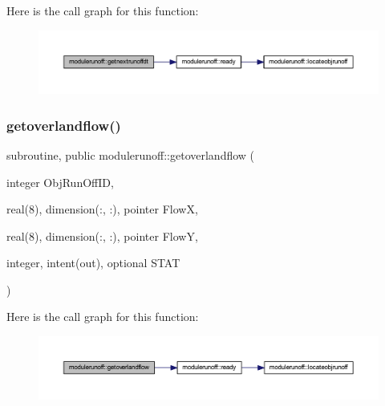 Here is the call graph for this function\+:\nopagebreak
\begin{figure}[H]
\begin{center}
\leavevmode
\includegraphics[width=350pt]{namespacemodulerunoff_a364cfd3bda8ba61cda13d20f848f20dc_cgraph}
\end{center}
\end{figure}
\mbox{\label{namespacemodulerunoff_a4d5da3ce5f5efddf1d2957ea8e1e1791}} 
\subsubsection{\texorpdfstring{getoverlandflow()}{getoverlandflow()}}
{\footnotesize\ttfamily subroutine, public modulerunoff\+::getoverlandflow (\begin{DoxyParamCaption}\item[{integer}]{Obj\+Run\+Off\+ID,  }\item[{real(8), dimension(\+:, \+:), pointer}]{FlowX,  }\item[{real(8), dimension(\+:, \+:), pointer}]{FlowY,  }\item[{integer, intent(out), optional}]{S\+T\+AT }\end{DoxyParamCaption})}

Here is the call graph for this function\+:\nopagebreak
\begin{figure}[H]
\begin{center}
\leavevmode
\includegraphics[width=350pt]{namespacemodulerunoff_a4d5da3ce5f5efddf1d2957ea8e1e1791_cgraph}
\end{center}
\end{figure}
\mbox{\label{namespacemodulerunoff_a092094d64e7a0ff361f536ab75f67317}} 
